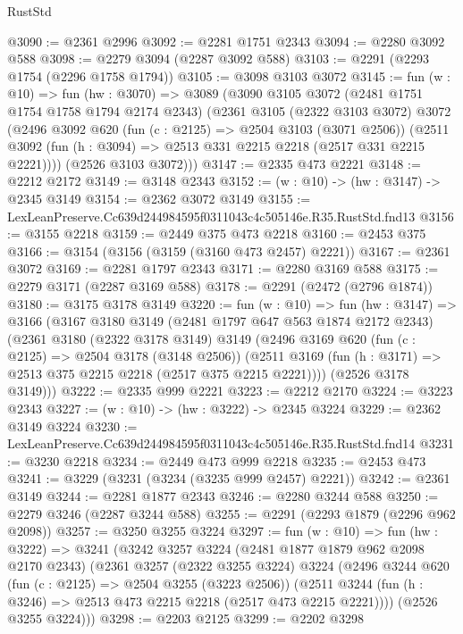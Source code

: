 \begin{lexlean}{RustStd}
\begin{coremodule}
@3090 := @2361 @2996
@3092 := @2281 @1751 @2343
@3094 := @2280 @3092 @588
@3098 := @2279 @3094 (@2287 @3092 @588)
@3103 := @2291 (@2293 @1754 (@2296 @1758 @1794))
@3105 := @3098 @3103 @3072
@3145 := fun (w : @10) =>
  fun (hw : @3070) =>
  @3089
    (@3090
      @3105
      @3072
      (@2481 @1751 @1754 @1758 @1794 @2174 @2343)
      (@2361
        @3105
        (@2322 @3103 @3072)
        @3072
        (@2496
          @3092
          @620
          (fun (c : @2125) => @2504 @3103 (@3071 @2506))
          (@2511 @3092 (fun (h : @3094) => @2513 @331 @2215 @2218 (@2517 @331 @2215 @2221))))
        (@2526 @3103 @3072)))
@3147 := @2335 @473 @2221
@3148 := @2212 @2172
@3149 := @3148 @2343
@3152 := (w : @10) -> (hw : @3147) -> @2345 @3149
@3154 := @2362 @3072 @3149
@3155 := LexLeanPreserve.Cc639d244984595f0311043c4c505146e.R35.RustStd.fnd13
@3156 := @3155 @2218
@3159 := @2449 @375 @473 @2218
@3160 := @2453 @375
@3166 := @3154 (@3156 (@3159 (@3160 @473 @2457) @2221))
@3167 := @2361 @3072
@3169 := @2281 @1797 @2343
@3171 := @2280 @3169 @588
@3175 := @2279 @3171 (@2287 @3169 @588)
@3178 := @2291 (@2472 (@2796 @1874))
@3180 := @3175 @3178 @3149
@3220 := fun (w : @10) =>
  fun (hw : @3147) =>
  @3166
    (@3167
      @3180
      @3149
      (@2481 @1797 @647 @563 @1874 @2172 @2343)
      (@2361
        @3180
        (@2322 @3178 @3149)
        @3149
        (@2496
          @3169
          @620
          (fun (c : @2125) => @2504 @3178 (@3148 @2506))
          (@2511 @3169 (fun (h : @3171) => @2513 @375 @2215 @2218 (@2517 @375 @2215 @2221))))
        (@2526 @3178 @3149)))
@3222 := @2335 @999 @2221
@3223 := @2212 @2170
@3224 := @3223 @2343
@3227 := (w : @10) -> (hw : @3222) -> @2345 @3224
@3229 := @2362 @3149 @3224
@3230 := LexLeanPreserve.Cc639d244984595f0311043c4c505146e.R35.RustStd.fnd14
@3231 := @3230 @2218
@3234 := @2449 @473 @999 @2218
@3235 := @2453 @473
@3241 := @3229 (@3231 (@3234 (@3235 @999 @2457) @2221))
@3242 := @2361 @3149
@3244 := @2281 @1877 @2343
@3246 := @2280 @3244 @588
@3250 := @2279 @3246 (@2287 @3244 @588)
@3255 := @2291 (@2293 @1879 (@2296 @962 @2098))
@3257 := @3250 @3255 @3224
@3297 := fun (w : @10) =>
  fun (hw : @3222) =>
  @3241
    (@3242
      @3257
      @3224
      (@2481 @1877 @1879 @962 @2098 @2170 @2343)
      (@2361
        @3257
        (@2322 @3255 @3224)
        @3224
        (@2496
          @3244
          @620
          (fun (c : @2125) => @2504 @3255 (@3223 @2506))
          (@2511 @3244 (fun (h : @3246) => @2513 @473 @2215 @2218 (@2517 @473 @2215 @2221))))
        (@2526 @3255 @3224)))
@3298 := @2203 @2125
@3299 := @2202 @3298

\end{coremodule}
\end{lexlean}

